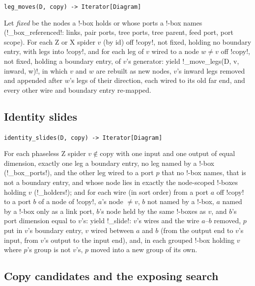 \begin{signature}
\texttt{leg\_\allowbreak{}moves(\allowbreak{}D,\allowbreak{} copy) -> Iterator[Diagram]}

Let \emph{fixed} be the nodes a !-box holds or whose ports a !-box names (\py!_box_referenced!: links, pair ports, tree ports, tree parent, feed port, port scope). For each Z or X spider $v$ (by id) off \code!copy!, not fixed, holding no boundary entry, with legs into \code!copy!, and for each leg of $v$ wired to a node $w\neq v$ off \code!copy!, not fixed, holding a boundary entry, of $v$'s generator: yield \py!_move_legs(D, v, inward, w)!, in which $v$ and $w$ are rebuilt as new nodes, $v$'s inward legs removed and appended after $w$'s legs of their direction, each wired to its old far end, and every other wire and boundary entry re-mapped.
\end{signature}

\subsection{Identity slides}

\begin{signature}
\texttt{identity\_\allowbreak{}slides(\allowbreak{}D,\allowbreak{} copy) -> Iterator[Diagram]}

For each phaseless Z spider $v\notin\text{copy}$ with one input and one output of equal dimension, exactly one leg a boundary entry, no leg named by a !-box (\py!_box_ports!), and the other leg wired to a port $p$ that no !-box names, that is not a boundary entry, and whose node lies in exactly the node-scoped !-boxes holding $v$ (\py!_holders!); and for each wire (in sort order) from a port $a$ off \code!copy! to a port $b$ of a node of \code!copy!, $a$'s node $\neq v$, $b$ not named by a !-box, $a$ named by a !-box only as a link port, $b$'s node held by the same !-boxes as $v$, and $b$'s port dimension equal to $v$'s: yield \py!_slide!: $v$'s wires and the wire $a$--$b$ removed, $p$ put in $v$'s boundary entry, $v$ wired between $a$ and $b$ (from the output end to $v$'s input, from $v$'s output to the input end), and, in each grouped !-box holding $v$ where $p$'s group is not $v$'s, $p$ moved into a new group of its own.
\end{signature}

\subsection{Copy candidates and the exposing search}

